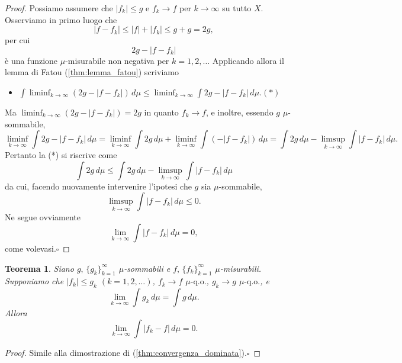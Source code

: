 \documentclass[a4paper,10pt,openright,oneside]{book}
\theoremstyle{theoremstyle}
\newtheorem{teorema}{Teorema}[section]
\theoremstyle{theoremstylewoheader}
\theoremstyle{theoremstyle}
\theoremstyle{proofsecstyle}
\theoremstyle{nonumberplain}
\newtheorem{proof}{Dim.}
\newcommand{\abs}[1]{\ensuremath{\lvert #1 \rvert}}
\newcommand{\qo}[1]{\ensuremath{#1\text{-q.o.}}}
\renewcommand{\qedsymbol}{\ensuremath{\square}}
\newcommand{\qed}{\unskip\nobreak\hfill\nobreak\hspace{.5em}\qedsymbol}
\newcommand{\mymath}[2]{\begin{itemize}%
  \item[]\hfill\hbox{}\ensuremath{\displaystyle #1}\hfill\ensuremath{\displaystyle #2}%
  \end{itemize}}
\begin{document}
\begin{proof}
Possiamo assumere che $\abs{f_k} \le g$ e $f_k \to f$ per $k \to \infty$ su tutto $X$. Osserviamo in primo luogo che
\[
\abs{f - f_k} \le \abs{f} + \abs{f_k} \le g + g = 2g,
\]
per cui
\[
2g - \abs{f - f_k}
\]
è una funzione $\mu$-misurabile non negativa per $k = 1, 2, \ldots$ Applicando allora il lemma di Fatou (\ref{thm:lemma_fatou}) scriviamo \mymath{\int \liminf_{k \to \infty} (2g - \abs{f - f_k})\, d\mu \le \liminf_{k \to \infty} \int 2g - \abs{f - f_k}\, d\mu.}{(*)} Ma $\liminf_{k \to \infty} (2g - \abs{f - f_k}) = 2g$ in quanto $f_k \to f$, e inoltre, essendo $g$ $\mu$-sommabile,
\[
\liminf_{k \to \infty} \int 2g - \abs{f - f_k}\, d\mu = \liminf_{k \to \infty} \int 2g\, d\mu + \liminf_{k \to \infty} \int (-\abs{f - f_k})\, d\mu = \int 2g\, d\mu - \limsup_{k \to \infty} \int \abs{f - f_k}\, d\mu.
\]
Pertanto la (*) si riscrive come
\[
\int 2g\, d\mu \le \int 2g\, d\mu - \limsup_{k \to \infty} \int \abs{f - f_k}\, d\mu
\]
da cui, facendo nuovamente intervenire l'ipotesi che $g$ sia $\mu$-sommabile,
\[
\limsup_{k \to \infty} \int \abs{f - f_k}\, d\mu \le 0.
\]
Ne segue ovviamente
\[
\lim_{k \to \infty} \int \abs{f - f_k}\, d\mu = 0,
\]
come volevasi.\qed
\end{proof}

\begin{teorema}
Siano $g,\, \{g_k\}_{k=1}^\infty$ $\mu$-sommabili e $f,\, \{f_k\}_{k=1}^\infty$ $\mu$-misurabili. Supponiamo che $\abs{f_k} \le g_k$ $(k = 1, 2, \ldots)$, $f_k \to f$ $\qo{\mu}$, $g_k \to g$ $\qo{\mu}$, e
\[
\lim_{k \to \infty} \int g_k\, d\mu = \int g\, d\mu.
\]
Allora
\[
\lim_{k \to \infty} \int \abs{f_k - f}\, d\mu = 0.
\]
\end{teorema}

\begin{proof}
Simile alla dimostrazione di (\ref{thm:convergenza_dominata}).\qed
\end{proof}
\end{document}

